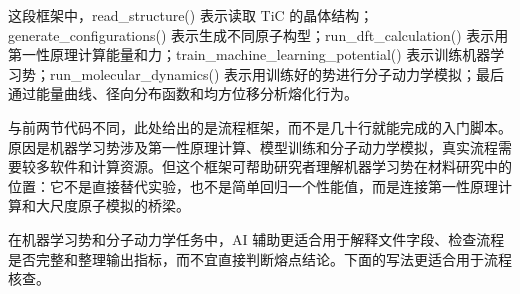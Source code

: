 这段框架中，read\_\allowbreak{}structure() 表示读取 TiC 的晶体结构；generate\_\allowbreak{}configurations() 表示生成不同原子构型；run\_\allowbreak{}dft\_\allowbreak{}calculation() 表示用第一性原理计算能量和力；train\_\allowbreak{}machine\_\allowbreak{}learning\_\allowbreak{}potential() 表示训练机器学习势；run\_\allowbreak{}molecular\_\allowbreak{}dynamics() 表示用训练好的势进行分子动力学模拟；最后通过能量曲线、径向分布函数和均方位移分析熔化行为。


与前两节代码不同，此处给出的是流程框架，而不是几十行就能完成的入门脚本。原因是机器学习势涉及第一性原理计算、模型训练和分子动力学模拟，真实流程需要较多软件和计算资源。但这个框架可帮助研究者理解机器学习势在材料研究中的位置：它不是直接替代实验，也不是简单回归一个性能值，而是连接第一性原理计算和大尺度原子模拟的桥梁。


在机器学习势和分子动力学任务中，AI 辅助更适合用于解释文件字段、检查流程是否完整和整理输出指标，而不宜直接判断熔点结论。下面的写法更适合用于流程核查。

